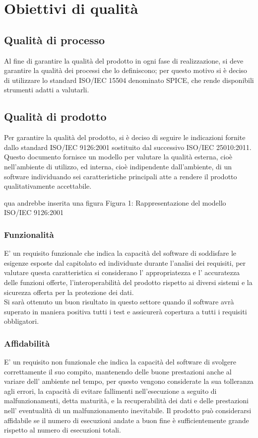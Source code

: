 \section{Obiettivi di qualità} 
\subsection{Qualità di processo}

Al fine di garantire la qualità del prodotto in ogni fase di realizzazione, si deve garantire la qualità dei processi che lo definiscono; per questo motivo si è deciso di utilizzare lo standard ISO/IEC 15504 denominato SPICE, che rende disponibili strumenti adatti a valutarli.

\subsection{Qualità di prodotto}
Per garantire la qualità del prodotto, si è deciso di seguire le indicazioni fornite dallo
standard ISO/IEC 9126:2001 sostituito dal successivo ISO/IEC 25010:2011. Questo
documento fornisce un modello per valutare la qualità esterna, cioè nell’ambiente
di utilizzo, ed interna, cioè indipendente dall’ambiente, di un software individuando
sei caratteristiche principali atte a rendere il prodotto qualitativamente accettabile.

qua andrebbe inserita una figura Figura 1: Rappresentazione del modello ISO/IEC 9126:2001

\subsubsection{Funzionalità}
E' un requisito funzionale che indica la capacità del software di soddisfare le esigenze esposte dal capitolato ed individuate durante l’analisi dei requisiti, per valutare questa caratteristica si considerano l' appropriatezza e l' accuratezza delle funzioni offerte, l'interoperabilità del prodotto rispetto ai diversi sistemi e la sicurezza offerta per la protezione dei dati.\\ 
Si sarà ottenuto un buon risultato in questo settore quando il software avrà superato in maniera positiva tutti i test e assicurerà copertura a tutti
i requisiti obbligatori.

\subsubsection{Affidabilità}

E' un requisito non funzionale che indica la capacità del software di svolgere correttamente il suo compito, mantenendo delle buone prestazioni anche al variare dell' ambiente nel tempo, per questo vengono considerate la sua tolleranza agli errori, la capacità di evitare fallimenti nell’esecuzione a seguito di malfunzionamenti,
detta maturità, e la recuperabilità dei dati e delle prestazioni nell' eventualità di un malfunzionamento inevitabile. Il prodotto può considerarsi affidabile se il numero di esecuzioni andate a buon fine è sufficientemente grande rispetto al numero di esecuzioni totali.


